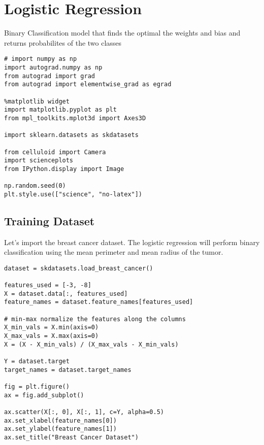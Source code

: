 \documentclass[openany]{book}
\begin{document}
    \section{Logistic Regression}\label{logistic-regression}

Binary Classification model that finds the optimal the weights and bias
and returns probabilites of the two classes

\begin{tcolorbox}
\tiny
\begin{verbatim}
# import numpy as np
import autograd.numpy as np
from autograd import grad
from autograd import elementwise_grad as egrad

%matplotlib widget
import matplotlib.pyplot as plt
from mpl_toolkits.mplot3d import Axes3D

import sklearn.datasets as skdatasets

from celluloid import Camera
import scienceplots
from IPython.display import Image

np.random.seed(0)
plt.style.use(["science", "no-latex"])
\end{verbatim}
\end{tcolorbox}

    \subsection{Training Dataset}\label{training-dataset}

Let's import the breast cancer dataset. The logistic regression will
perform binary classification using the mean perimeter and mean radius
of the tumor.

\begin{tcolorbox}
\tiny
\begin{verbatim}
dataset = skdatasets.load_breast_cancer()

features_used = [-3, -8]
X = dataset.data[:, features_used]
feature_names = dataset.feature_names[features_used]

# min-max normalize the features along the columns
X_min_vals = X.min(axis=0)
X_max_vals = X.max(axis=0)
X = (X - X_min_vals) / (X_max_vals - X_min_vals)

Y = dataset.target
target_names = dataset.target_names

fig = plt.figure()
ax = fig.add_subplot()

ax.scatter(X[:, 0], X[:, 1], c=Y, alpha=0.5)
ax.set_xlabel(feature_names[0])
ax.set_ylabel(feature_names[1])
ax.set_title("Breast Cancer Dataset")
\end{verbatim}
\end{tcolorbox}
        
\end{document}
